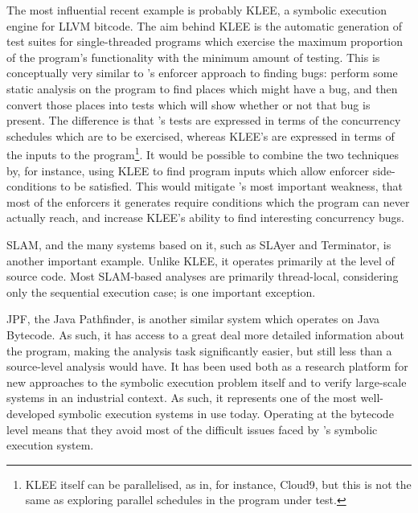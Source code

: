 The most influential recent example is probably KLEE\cite{Cadar}, a
symbolic execution engine for LLVM bitcode\cite{Lattner2013}.  The aim
behind KLEE is the automatic generation of test suites for
single-threaded programs which exercise the maximum proportion of the
program's functionality with the minimum amount of testing.  This is
conceptually very similar to {\technique}'s enforcer approach to
finding bugs: perform some static analysis on the program to find
places which might have a bug, and then convert those places into
tests which will show whether or not that bug is present.  The
difference is that {\technique}'s tests are expressed in terms of the
concurrency schedules which are to be exercised, whereas KLEE's are
expressed in terms of the inputs to the program\footnote{KLEE itself
  can be parallelised, as in, for instance, Cloud9\cite{Ciortea2010},
  but this is not the same as exploring parallel schedules in the
  program under test.}.  It would be possible to combine the two
techniques by, for instance, using KLEE to find program inputs which
allow {\technique} enforcer side-conditions to be satisfied.  This
would mitigate {\technique}'s most important weakness, that most of
the enforcers it generates require conditions which the program can
never actually reach, and increase KLEE's ability to find interesting
concurrency bugs.

SLAM\cite{Ball2011}, and the many systems based on it, such as
SLAyer\cite{Berdine2011} and Terminator\cite{Cook2006a}, is another
important example.  Unlike KLEE, it operates primarily at the level of
source code.  Most SLAM-based analyses are primarily thread-local,
considering only the sequential execution case; \cite{Cook2007} is one
important exception.  

JPF, the Java Pathfinder\cite{Havelund2000}, is another similar system
which operates on Java Bytecode\cite{Lindholm2013}.  As such, it has
access to a great deal more detailed information about the program,
making the analysis task significantly easier, but still less than a
source-level analysis would have.  It has been used both as a research
platform for new approaches to the symbolic execution problem
itself\cite{D'Amorim2008,Gligoric2010} and to verify large-scale
systems in an industrial context\cite{PCZsCZreanu2008}.  As such, it
represents one of the most well-developed symbolic execution systems
in use today.  Operating at the bytecode level means that they avoid
most of the difficult issues faced by {\technique}'s symbolic
execution system.

